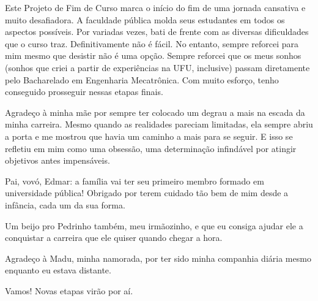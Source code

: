 \documentclass[12pt, %
openright, 
oneside, %
a4paper,    %
brazil]{facom-ufu-abntex2}
\begin{document}


\begin{agradecimentos}
Este Projeto de Fim de Curso marca o início do fim de uma jornada cansativa e muito desafiadora. A faculdade pública molda seus estudantes em todos os aspectos possíveis. Por variadas vezes, bati de frente com as diversas dificuldades que o curso traz. Definitivamente não é fácil. No entanto, sempre reforcei para mim mesmo que desistir não é uma opção. Sempre reforcei que os meus sonhos (sonhos que criei a partir de experiências na UFU, inclusive) passam diretamente pelo Bacharelado em Engenharia Mecatrônica. Com muito esforço, tenho conseguido prosseguir nessas etapas finais.

Agradeço à minha mãe por sempre ter colocado um degrau a mais na escada da minha carreira. Mesmo quando as realidades pareciam limitadas, ela sempre abriu a porta e me mostrou que havia um caminho a mais para se seguir. E isso se refletiu em mim como uma obsessão, uma determinação infindável por atingir objetivos antes impensáveis.

Pai, vovó, Edmar: a família vai ter seu primeiro membro formado em universidade pública! Obrigado por terem cuidado tão bem de mim desde a infância, cada um da sua forma.

Um beijo pro Pedrinho também, meu irmãozinho, e que eu consiga ajudar ele a conquistar a carreira que ele quiser quando chegar a hora.

Agradeço à Madu, minha namorada, por ter sido minha companhia diária mesmo enquanto eu estava distante.

Vamos! Novas etapas virão por aí.
\end{agradecimentos}

\end{document}
